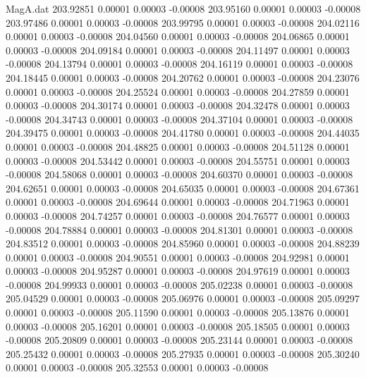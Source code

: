 \begin{filecontents}{MagA.dat}
 203.92851    0.00001    0.00003   -0.00008
 203.95160    0.00001    0.00003   -0.00008
 203.97486    0.00001    0.00003   -0.00008
 203.99795    0.00001    0.00003   -0.00008
 204.02116    0.00001    0.00003   -0.00008
 204.04560    0.00001    0.00003   -0.00008
 204.06865    0.00001    0.00003   -0.00008
 204.09184    0.00001    0.00003   -0.00008
 204.11497    0.00001    0.00003   -0.00008
 204.13794    0.00001    0.00003   -0.00008
 204.16119    0.00001    0.00003   -0.00008
 204.18445    0.00001    0.00003   -0.00008
 204.20762    0.00001    0.00003   -0.00008
 204.23076    0.00001    0.00003   -0.00008
 204.25524    0.00001    0.00003   -0.00008
 204.27859    0.00001    0.00003   -0.00008
 204.30174    0.00001    0.00003   -0.00008
 204.32478    0.00001    0.00003   -0.00008
 204.34743    0.00001    0.00003   -0.00008
 204.37104    0.00001    0.00003   -0.00008
 204.39475    0.00001    0.00003   -0.00008
 204.41780    0.00001    0.00003   -0.00008
 204.44035    0.00001    0.00003   -0.00008
 204.48825    0.00001    0.00003   -0.00008
 204.51128    0.00001    0.00003   -0.00008
 204.53442    0.00001    0.00003   -0.00008
 204.55751    0.00001    0.00003   -0.00008
 204.58068    0.00001    0.00003   -0.00008
 204.60370    0.00001    0.00003   -0.00008
 204.62651    0.00001    0.00003   -0.00008
 204.65035    0.00001    0.00003   -0.00008
 204.67361    0.00001    0.00003   -0.00008
 204.69644    0.00001    0.00003   -0.00008
 204.71963    0.00001    0.00003   -0.00008
 204.74257    0.00001    0.00003   -0.00008
 204.76577    0.00001    0.00003   -0.00008
 204.78884    0.00001    0.00003   -0.00008
 204.81301    0.00001    0.00003   -0.00008
 204.83512    0.00001    0.00003   -0.00008
 204.85960    0.00001    0.00003   -0.00008
 204.88239    0.00001    0.00003   -0.00008
 204.90551    0.00001    0.00003   -0.00008
 204.92981    0.00001    0.00003   -0.00008
 204.95287    0.00001    0.00003   -0.00008
 204.97619    0.00001    0.00003   -0.00008
 204.99933    0.00001    0.00003   -0.00008
 205.02238    0.00001    0.00003   -0.00008
 205.04529    0.00001    0.00003   -0.00008
 205.06976    0.00001    0.00003   -0.00008
 205.09297    0.00001    0.00003   -0.00008
 205.11590    0.00001    0.00003   -0.00008
 205.13876    0.00001    0.00003   -0.00008
 205.16201    0.00001    0.00003   -0.00008
 205.18505    0.00001    0.00003   -0.00008
 205.20809    0.00001    0.00003   -0.00008
 205.23144    0.00001    0.00003   -0.00008
 205.25432    0.00001    0.00003   -0.00008
 205.27935    0.00001    0.00003   -0.00008
 205.30240    0.00001    0.00003   -0.00008
 205.32553    0.00001    0.00003   -0.00008

\end{filecontents}
